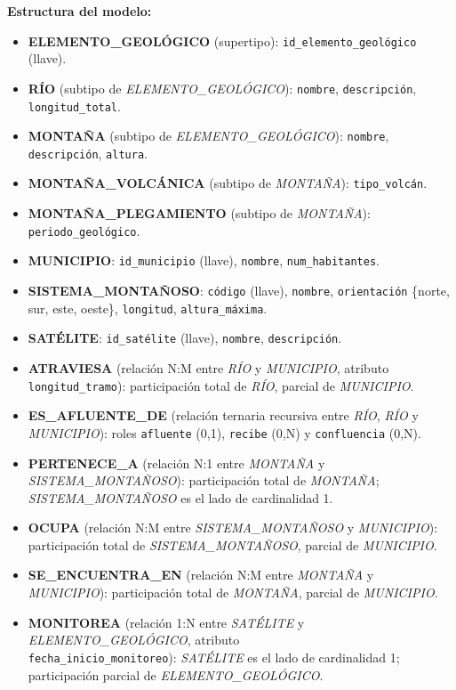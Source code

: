 \textbf{Estructura del modelo:}

\begin{itemize}
    \item \textbf{ELEMENTO\_GEOLÓGICO} (supertipo): \texttt{id\_elemento\_geológico} (llave).
    \item \textbf{RÍO} (subtipo de \textit{ELEMENTO\_GEOLÓGICO}): \texttt{nombre}, \texttt{descripción}, \texttt{longitud\_total}.
    \item \textbf{MONTAÑA} (subtipo de \textit{ELEMENTO\_GEOLÓGICO}): \texttt{nombre}, \texttt{descripción}, \texttt{altura}.
    \item \textbf{MONTAÑA\_VOLCÁNICA} (subtipo de \textit{MONTAÑA}): \texttt{tipo\_volcán}.
    \item \textbf{MONTAÑA\_PLEGAMIENTO} (subtipo de \textit{MONTAÑA}): \texttt{periodo\_geológico}.
    \item \textbf{MUNICIPIO}: \texttt{id\_municipio} (llave), \texttt{nombre}, \texttt{num\_habitantes}.
    \item \textbf{SISTEMA\_MONTAÑOSO}: \texttt{código} (llave), \texttt{nombre}, \texttt{orientación} \{norte, sur, este, oeste\}, \texttt{longitud}, \texttt{altura\_máxima}.
    \item \textbf{SATÉLITE}: \texttt{id\_satélite} (llave), \texttt{nombre}, \texttt{descripción}.
    \item \textbf{ATRAVIESA} (relación N:M entre \textit{RÍO} y \textit{MUNICIPIO}, atributo \texttt{longitud\_tramo}): participación total de \textit{RÍO}, parcial de \textit{MUNICIPIO}.
    \item \textbf{ES\_AFLUENTE\_DE} (relación ternaria recursiva entre \textit{RÍO}, \textit{RÍO} y \textit{MUNICIPIO}): roles \texttt{afluente} (0,1), \texttt{recibe} (0,N) y \texttt{confluencia} (0,N).
    \item \textbf{PERTENECE\_A} (relación N:1 entre \textit{MONTAÑA} y \textit{SISTEMA\_MONTAÑOSO}): participación total de \textit{MONTAÑA}; \textit{SISTEMA\_MONTAÑOSO} es el lado de cardinalidad 1.
    \item \textbf{OCUPA} (relación N:M entre \textit{SISTEMA\_MONTAÑOSO} y \textit{MUNICIPIO}): participación total de \textit{SISTEMA\_MONTAÑOSO}, parcial de \textit{MUNICIPIO}.
    \item \textbf{SE\_ENCUENTRA\_EN} (relación N:M entre \textit{MONTAÑA} y \textit{MUNICIPIO}): participación total de \textit{MONTAÑA}, parcial de \textit{MUNICIPIO}.
    \item \textbf{MONITOREA} (relación 1:N entre \textit{SATÉLITE} y \textit{ELEMENTO\_GEOLÓGICO}, atributo\\ \texttt{fecha\_inicio\_monitoreo}): \textit{SATÉLITE} es el lado de cardinalidad 1; participación parcial de \textit{ELEMENTO\_GEOLÓGICO}.
\end{itemize}

